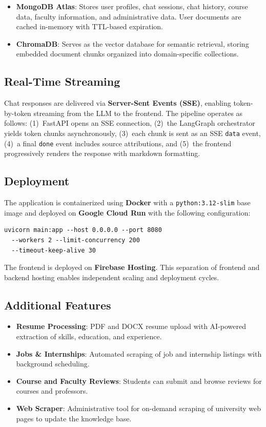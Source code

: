 \documentclass[conference,compsoc]{IEEEtran}
\begin{document}
\begin{itemize}
    \item \textbf{MongoDB Atlas}: Stores user profiles, chat sessions, chat history, course data, faculty information, and administrative data. User documents are cached in-memory with TTL-based expiration.
    \item \textbf{ChromaDB}: Serves as the vector database for semantic retrieval, storing embedded document chunks organized into domain-specific collections.
\end{itemize}

\subsection{Real-Time Streaming}

Chat responses are delivered via \textbf{Server-Sent Events (SSE)}, enabling token-by-token streaming from the LLM to the frontend. The pipeline operates as follows: (1)~FastAPI opens an SSE connection, (2)~the LangGraph orchestrator yields token chunks asynchronously, (3)~each chunk is sent as an SSE \texttt{data} event, (4)~a final \texttt{done} event includes source attributions, and (5)~the frontend progressively renders the response with markdown formatting.

\subsection{Deployment}

The application is containerized using \textbf{Docker} with a \texttt{python:3.12-slim} base image and deployed on \textbf{Google Cloud Run} with the following configuration:

\begin{lstlisting}[basicstyle=\ttfamily\scriptsize]
uvicorn main:app --host 0.0.0.0 --port 8080
  --workers 2 --limit-concurrency 200
  --timeout-keep-alive 30
\end{lstlisting}

The frontend is deployed on \textbf{Firebase Hosting}. This separation of frontend and backend hosting enables independent scaling and deployment cycles.

\subsection{Additional Features}

\begin{itemize}
    \item \textbf{Resume Processing}: PDF and DOCX resume upload with AI-powered extraction of skills, education, and experience.
    \item \textbf{Jobs \& Internships}: Automated scraping of job and internship listings with background scheduling.
    \item \textbf{Course and Faculty Reviews}: Students can submit and browse reviews for courses and professors.
    \item \textbf{Web Scraper}: Administrative tool for on-demand scraping of university web pages to update the knowledge base.
\end{itemize}
\end{document}
